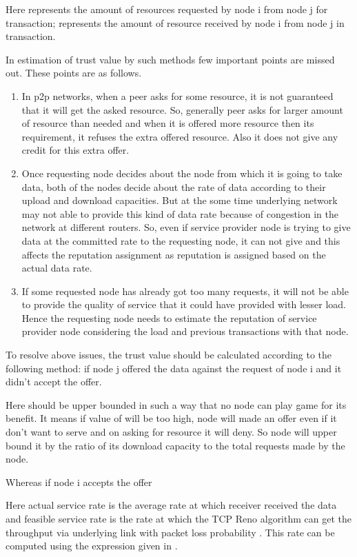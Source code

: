 \documentclass{IEEEtran}
\begin{document}
Here  represents the amount of resources requested by node i from node j
for  transaction;   represents the amount of resource
received by node i from node j in  transaction.

In estimation of trust value by such methods few important points are missed out. These points are as follows.
\begin{enumerate}
\item In p2p networks, when a peer asks for some resource, it is not guaranteed that it will get the asked resource. So, generally peer asks for larger amount of resource than needed and when it is offered more resource then its requirement, it refuses the extra offered resource. Also it does not give any credit for this extra offer.
\item Once requesting node decides about the node from which it is going to take data, both of the nodes decide about the rate of data according to their upload and download capacities. But at the some time underlying network may not able to provide this kind of data rate because of congestion in the network at different routers. So, even if service provider node is trying to give data at the committed rate to the requesting node, it can not give and this affects the reputation assignment as reputation is assigned based on the actual data rate.
\item If some requested node has already got too many requests, it will not be able to provide the quality of service that it could have provided with lesser load. Hence the requesting node needs to estimate the reputation of service provider node considering the load and previous transactions with that node.
\end{enumerate}
To resolve above issues, the trust value should be calculated according to the following method:
if node j offered the data against the request of node i and it didn't accept the offer.

Here  should be upper bounded in such a way that no node can play game for its benefit. It means if value of  will be too high, node will made an offer even if it don't want to serve and on asking for resource it will deny. So node will upper bound it by the ratio of its download capacity to the total requests made by the node.

Whereas if node i accepts the offer

Here actual service rate is the average rate at which receiver received the data and feasible service rate is the rate at which the TCP Reno algorithm can get the throughput via underlying link with packet loss probability . This rate can be computed using the expression given in \cite{tcpreno}.
\end{document}
